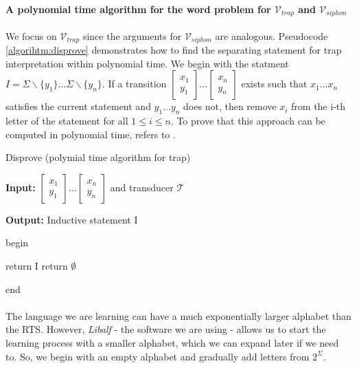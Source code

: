 \paragraph{A polynomial time algorithm for the word problem for $\mathcal{V}_{trap}$ and $\mathcal{V}_{siphon}$}
We focus on $\mathcal{V}_{trap}$ since the arguments for $\mathcal{V}_{siphon}$ are analogous.
Pseudocode \ref{algorihtm:disprove} demonstrates how to find the separating 
statement for trap interpretation within polynomial time.
We begin with the statment $I = \Sigma \backslash \{y_1\} \dots \Sigma \backslash \{y_n\}$.
If a transition $\left[\substack{x_1 \\ y_1}\right] \dots \left[\substack{x_n \\ y_n}\right]$ exists such that 
$x_1 \dots x_n$ satisfies the current statement and $y_1 \dots y_n$ does not,
then remove $x_i$ from the i-th letter of the statement for all $1 \leq i \leq n$.
To prove that this approach can be computed in polynomial time, refers to \cite{Welzel2023InductiveSts}.

\begin{algorithm}
    \caption{Disprove (polymial time algorithm for trap)}\label{algorihtm:disprove}
    \textbf{Input: } $\left[\substack{x_1 \\ y_1}\right] \dots \left[\substack{x_n \\ y_n}\right]$ and transducer $\mathcal{T}$

    \textbf{Output: } Inductive statement I
    
    begin
    \begin{algorithmic}[1]
        \EndFor
                \EndFor
            \Else
                \State return I
            \EndIf
        \EndWhile
        \State return $\emptyset$
    \end{algorithmic}
    end
\end{algorithm}
\paragraph{}
The language we are learning can have a much exponentially larger alphabet than the RTS. 
However, \textit{Libalf} - the software we are using - allows us to start the learning process with a smaller alphabet, 
which we can expand later if we need to. 
So, we begin with an empty alphabet and gradually add letters from $2^\Sigma$.

